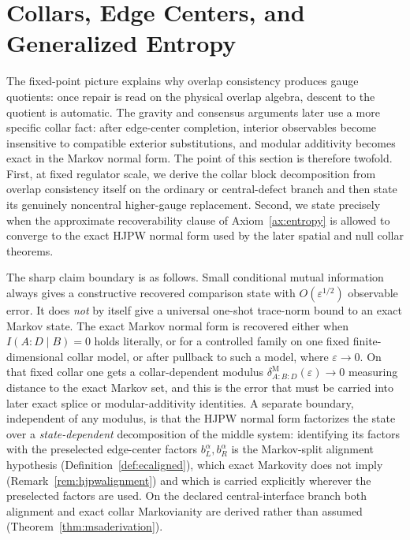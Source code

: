 \documentclass[11pt]{article}
\begin{document}
\section{Collars, Edge Centers, and Generalized Entropy}

The fixed-point picture explains why overlap consistency produces gauge quotients: once repair is
read on the physical overlap algebra, descent to the quotient is automatic. The gravity and
consensus arguments later use a more specific collar fact: after edge-center completion, interior
observables become insensitive to compatible exterior substitutions, and modular additivity becomes
exact in the Markov normal form. The point of this section is therefore twofold. First, at fixed
regulator scale, we derive the collar block decomposition from overlap consistency itself on the
ordinary or central-defect branch and then state its genuinely noncentral higher-gauge replacement.
Second, we state precisely when the approximate recoverability clause of Axiom~\ref{ax:entropy} is
allowed to converge to the exact HJPW normal form used by the later spatial and null collar
theorems.

The sharp claim boundary is as follows. Small conditional mutual information always gives a constructive recovered comparison state with \(O(\varepsilon^{1/2})\) observable error. It does \emph{not} by itself give a universal one-shot trace-norm bound to an exact Markov state. The exact Markov normal form is recovered either when \(I(A:D\mid B)=0\) holds literally, or for a controlled family on one fixed finite-dimensional collar model, or after pullback to such a model, where \(\varepsilon\to0\). On that fixed collar one gets a collar-dependent modulus \(\delta^{\mathrm M}_{A:B:D}(\varepsilon)\to0\) measuring distance to the exact Markov set, and this is the error that must be carried into later exact splice or modular-additivity identities. A separate boundary, independent of any modulus, is that the HJPW normal form factorizes the state over a \emph{state-dependent} decomposition of the middle system: identifying its factors with the preselected edge-center factors \(b_L^\alpha,b_R^\alpha\) is the Markov-split alignment hypothesis (Definition~\ref{def:ecaligned}), which exact Markovity does not imply (Remark~\ref{rem:hjpwalignment}) and which is carried explicitly wherever the preselected factors are used. On the declared central-interface branch both alignment and exact collar Markovianity are derived rather than assumed (Theorem~\ref{thm:msaderivation}).
\end{document}
